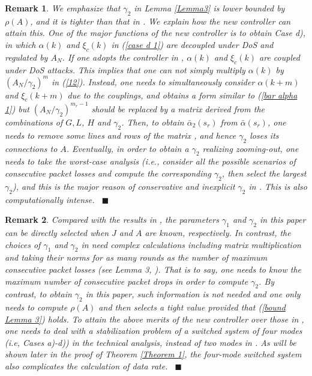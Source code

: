 \documentclass[letterpaper,journal,final,twocolumn]{IEEEtran}
\def\qedp{\hspace*{\fill}~{\tiny $\blacksquare$}}
\newtheorem{itremark}{Remark}
\newenvironment{remark}{\begin{itremark}\rm}{\end{itremark}}
\begin{document}
\begin{remark}
We emphasize that $\gamma_2$ in Lemma \ref{Lemma3} is lower bounded by $\rho(A)$, and it is tighter than that in \cite{feng2020arxiv}. We explain how the new controller can attain this. One of the major functions of the new controller is to obtain Case d), in which $\alpha(k)$ and $\xi_c(k)$ in (\ref{case d 1}) are decoupled under DoS and regulated by $A_N$. If one adopts the controller in \cite{feng2020arxiv}, $\alpha(k)$ and $\xi_c(k)$ are coupled under DoS attacks. This implies that one can not simply multiply $\alpha(k)$ by $(A_N /\gamma_2)^m$ in (\ref{12}). Instead, one needs to simultaneously consider $\alpha(k+m)$ and $\xi_c(k+m)$ due to the couplings, and obtains a form similar to (\ref{bar alpha 1}) but $(A_N/\gamma_2) ^ {m_r -1}$ should be replaced by a matrix derived from the combinations of $G, L$, $H$ and $\gamma_2$. Then, to obtain $\bar \alpha_2(s_r)$ from $\bar \alpha(s_r)$, one needs to remove some lines and rows of the matrix \cite{feng2020arxiv}, and hence $\gamma_2$ loses its connections to $A$. Eventually, in order to obtain a $\gamma_2$ realizing zooming-out, one needs to take the worst-case analysis (i.e., consider all the possible scenarios of consecutive packet losses and compute the corresponding $\gamma_2$, then select the largest $\gamma_2$), and this is the major reason of conservative and inexplicit $\gamma_2$ in \cite{feng2020arxiv}. This is also computationally intense.    \qedp
\end{remark}


\begin{remark}
	Compared with the results in \cite{feng2020arxiv}, the parameters $\gamma_1$ and $\gamma_2$ in this paper can be directly selected when $J$ and $A$ are known, respectively. In contrast, the choices of $\gamma_1$ and $\gamma_2$ in \cite{feng2020arxiv} need complex calculations including matrix multiplication and taking their norms for as many rounds as the number of maximum consecutive packet losses (see Lemma 3, \cite{feng2020arxiv}). 
	That is to say, one needs to know the maximum number of consecutive packet drops in order to compute $\gamma_2$. 
	By contrast, to obtain $\gamma_2$ in this paper, such information is not needed and one only needs to compute $\rho(A)$ and then selects a tight value provided that (\ref{bound Lemma 3}) holds. To attain the above merits of the new controller over those in \cite{feng2020arxiv}, one needs to deal with a stabilization problem of a switched system of four modes (i.e, Cases a)-d)) in the technical analysis, instead of two modes in \cite{feng2020arxiv}. As will be shown later in the proof of Theorem \ref{Theorem 1}, the four-mode switched system also complicates the calculation of data rate.   \qedp
\end{remark}
\end{document}
